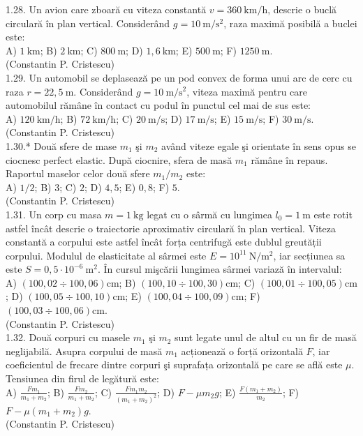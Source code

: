 1.28. Un avion care zboară cu viteza constantă $v=360 \mathrm{~km} / \mathrm{h}$, descrie o buclă circulară în plan vertical. Considerând $g=10 \mathrm{~m} / \mathrm{s}^{2}$, raza maximă posibilă a buclei este:\\ A) $1 \mathrm{~km}$; B) $2 \mathrm{~km}$; C) $800 \mathrm{~m}$; D) $1,6 \mathrm{~km}$; E) $500 \mathrm{~m}$; F) $1250 \mathrm{~m}$.\\ (Constantin P. Cristescu)\\

1.29. Un automobil se deplasează pe un pod convex de forma unui arc de cerc cu raza $r=22,5 \mathrm{~m}$. Considerând $g=10 \mathrm{~m} / \mathrm{s}^{2}$, viteza maximă pentru care automobilul rămâne în contact cu podul în punctul cel mai de sus este:\\ A) $120 \mathrm{~km} / \mathrm{h}$; B) $72 \mathrm{~km} / \mathrm{h}$; C) $20 \mathrm{~m} / \mathrm{s}$; D) $17 \mathrm{~m} / \mathrm{s}$; E) $15 \mathrm{~m} / \mathrm{s}$; F) $30 \mathrm{~m} / \mathrm{s}$.\\ (Constantin P. Cristescu)\\

1.30.* Două sfere de mase $m_{1}$ şi $m_{2}$ având viteze egale şi orientate în sens opus se ciocnesc perfect elastic. După ciocnire, sfera de masă $m_{1}$ rămâne în repaus. Raportul maselor celor două sfere $m_{1} / m_{2}$ este:\\ A) $1 / 2$; B) $3$; C) $2$; D) $4,5$; E) $0,8$; F) $5$.\\ (Constantin P. Cristescu)\\

1.31. Un corp cu masa $m=1 \mathrm{~kg}$ legat cu o sârmă cu lungimea $l_{0}=1 \mathrm{~m}$ este rotit astfel încât descrie o traiectorie aproximativ circulară în plan vertical. Viteza constantă a corpului este astfel încât forța centrifugă este dublul greutății corpului. Modulul de elasticitate al sârmei este $E=10^{11} \mathrm{~N} / \mathrm{m}^{2}$, iar secțiunea sa este $S=0,5 \cdot 10^{-6} \mathrm{~m}^{2}$. În cursul mişcării lungimea sârmei variază în intervalul:\\ A) $(100,02 \div 100,06) \mathrm{cm}$; B) $(100,10 \div 100,30) \mathrm{cm}$; C) $(100,01 \div 100,05) \mathrm{cm}$; D) $(100,05 \div 100,10) \mathrm{cm}$; E) $(100,04 \div 100,09) \mathrm{cm}$; F) $(100,03 \div 100,06) \mathrm{cm}$.\\ (Constantin P. Cristescu)\\

1.32. Două corpuri cu masele $m_{1}$ şi $m_{2}$ sunt legate unul de altul cu un fir de masă neglijabilă. Asupra corpului de masă $m_{1}$ acționează o forță orizontală $F$, iar coeficientul de frecare dintre corpuri şi suprafața orizontală pe care se află este $\mu$. Tensiunea din firul de legătură este:\\ A) $\frac{F m_{1}}{m_{1}+m_{2}}$; B) $\frac{F m_{2}}{m_{1}+m_{2}}$; C) $\frac{F m_{1} m_{2}}{\left(m_{1}+m_{2}\right)^{2}}$; D) $F-\mu m_{2} g$; E) $\frac{F\left(m_{1}+m_{2}\right)}{m_{2}}$; F) $F-\mu\left(m_{1}+m_{2}\right) g$.\\ (Constantin P. Cristescu)\\

